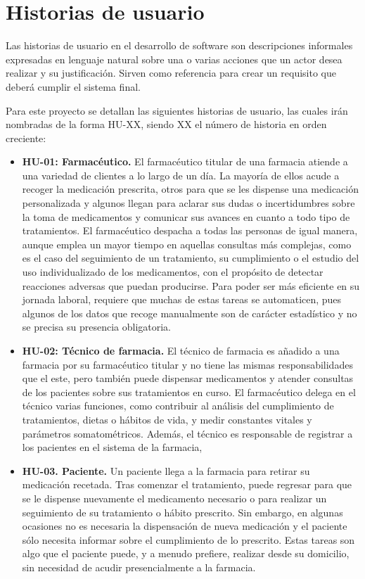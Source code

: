 \section{Historias de usuario}
Las historias de usuario en el desarrollo de software son descripciones informales expresadas en lenguaje natural sobre una o varias acciones que un actor desea realizar y su justificación. Sirven como referencia para crear un requisito que deberá cumplir el sistema final. 

Para este proyecto se detallan las siguientes historias de usuario, las cuales irán nombradas de la forma HU-XX, siendo XX el número de historia en orden creciente:

\begin{itemize}
	\item \textbf{HU-01: Farmacéutico.} El farmacéutico titular de una farmacia atiende a una variedad de clientes a lo largo de un día. La mayoría de ellos acude a recoger la medicación prescrita, otros para que se les dispense una medicación personalizada y algunos llegan para aclarar sus dudas o incertidumbres sobre la toma de medicamentos y comunicar sus avances en cuanto a todo tipo de tratamientos. El farmacéutico despacha a todas las personas de igual manera, aunque emplea un mayor tiempo en aquellas consultas más complejas, como es el caso del seguimiento de un tratamiento, su cumplimiento o el estudio del uso individualizado de los medicamentos, con el propósito de detectar reacciones adversas que puedan producirse. Para poder ser más eficiente en su jornada laboral, requiere que muchas de estas tareas se automaticen, pues algunos de los datos que recoge manualmente son de carácter estadístico y no se precisa su presencia obligatoria.
	
	\item \textbf{HU-02: Técnico de farmacia.} El técnico de farmacia es añadido a una farmacia por su farmacéutico titular y no tiene las mismas responsabilidades que el este, pero también puede dispensar medicamentos y atender consultas de los pacientes sobre sus tratamientos en curso. El farmacéutico delega en el técnico varias funciones, como contribuir al análisis del cumplimiento de tratamientos, dietas o hábitos de vida, y medir constantes vitales y parámetros somatométricos. Además, el técnico es responsable de registrar a los pacientes en el sistema de la farmacia, 
	
	\item \textbf{HU-03. Paciente.} Un paciente llega a la farmacia para retirar su medicación recetada. Tras comenzar el tratamiento, puede regresar para que se le dispense nuevamente el medicamento necesario o para realizar un seguimiento de su tratamiento o hábito prescrito. Sin embargo, en algunas ocasiones no es necesaria la dispensación de nueva medicación y el paciente sólo necesita informar sobre el cumplimiento de lo prescrito. Estas tareas son algo que el paciente puede, y a menudo prefiere, realizar desde su domicilio, sin necesidad de acudir presencialmente a la farmacia.
	

\end{itemize}
